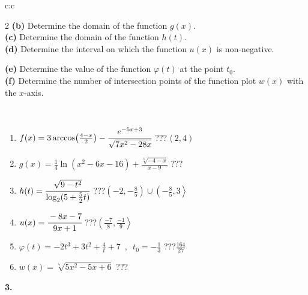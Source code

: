 \documentclass[10pt]{report}
\begin{document}
\begin{tabular}{c:c}
\begin{minipage}[c][104.5mm][t]{0.5\linewidth}
\begin{center}
\begin{minipage}{0.95\linewidth}
\begin{center}
{\begin{multicols}{2}
\textbf{(b)} Determine the domain of the function \(g(x)\). \\[1mm]
\textbf{(c)} Determine the domain of the function \(h(t)\). \\[1mm]
\textbf{(d)} Determine the interval on which the function \(u(x)\) is non-negative. \par \columnbreak
\textbf{(e)} Determine the value of the function \(\varphi(t)\) at the point \(t_0\). \\[1mm]
\textbf{(f)} Determine the number of intersection points of the function plot \(w(x)\) with the \(x\)-axis. \\[1mm]
\end{multicols}
}
\end{center}
\end{minipage}
\\[4mm]
\begin{minipage}{0.79\linewidth}
\begin{center}
\begin{varwidth}{\linewidth}
\begin{enumerate}
\small
\item $f(x) = 3\arccos\!\left( \frac{4-x}{2} \right) - \cfrac{e^{-5x+3}}{\sqrt{7x^2-28x}}$\quad \dotfill\; ???\;\dotfill \quad $\left\langle2 , 4\right)$
\item $g(x) = \frac{1}{4} \ln{\!(x^2-6x-16)}+\frac{\sqrt[3]{-4-x}}{x-9}$\quad \dotfill\; ???\;\dotfill {}
\item $h(t) = \cfrac{\sqrt{9-t^2}}{\log_2(5+\frac{5}{2}t)}$\quad \dotfill\; ???\;\dotfill \quad $\left(-2 , -\frac{8}{5}\right)\cup\left(-\frac{8}{5} , 3\right\rangle$
\item $u(x) = \cfrac{-8x-7}{9x+1}$\quad \dotfill\; ???\;\dotfill \quad $\left(\frac{-7}{8} , \frac{-1}{9}\right\rangle$
\item $\varphi(t) = -2t^3+3t^2+\frac{4}{t}+7 \enspace , \enspace t_0=-\frac{1}{3}$\quad \dotfill\; ???\;\dotfill \quad $\frac{164}{27}$
\item $w(x) = \sqrt[7]{5x^2-5x+6}$\quad \dotfill\; ???\;\dotfill {}
\end{enumerate}
\end{varwidth}
\end{center}
\end{minipage}
\begin{minipage}{0.20\linewidth}
\begin{center}
{\Huge\bfseries 3.} \\[2mm]

\end{center}
\end{minipage}
\end{center}
\end{minipage}
\end{tabular}
\end{document}
